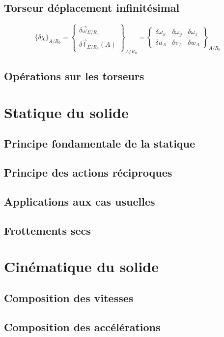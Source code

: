 \section{Torseur déplacement infinitésimal}
\begin{defi}

$${\lbrace\delta\chi\rbrace}_{A/R_0}=\begin{Bmatrix}\delta\overrightarrow{\omega}_{\Sigma/R_0}\\\delta\overrightarrow{l}_{\Sigma/R_0}(A)\end{Bmatrix}_{A/R_0}=\begin{Bmatrix} \delta\omega_x & \delta\omega_y  & \delta\omega_z\\ \delta u_A & \delta v_A & \delta w_A\end{Bmatrix}_{A/R_0}$$
\end{defi}
\section{Opérations sur les torseurs}
\chapter{Statique du solide}
\section{Principe fondamentale de la statique}
\section{Principe des actions réciproques}
\section{Applications aux cas usuelles}
\section{Frottements secs}
\chapter{Cinématique du solide}
\section{Composition des vitesses}
\section{Composition des accélérations}
